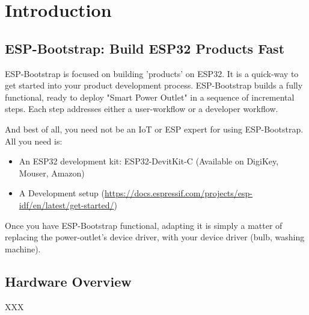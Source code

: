 \documentclass[11pt,fleqn]{book} %
\begin{document}

\pagestyle{fancy} %



\chapter{Introduction}

\section{ESP-Bootstrap: Build ESP32 Products Fast}

ESP-Bootstrap is focused on building 'products' on ESP32. It is a quick-way to get started into your product development process. ESP-Bootstrap builds a fully functional, ready to deploy "Smart Power Outlet" in a sequence of incremental steps. Each step addresses either a user-workflow or a developer workflow.

And best of all, you need not be an IoT or ESP expert for using ESP-Bootstrap. All you need is:

\begin{itemize}
\item An ESP32 development kit: ESP32-DevitKit-C (Available on DigiKey, Mouser, Amazon)
\item A Development setup (\url{https://docs.espressif.com/projects/esp-idf/en/latest/get-started/})
\end{itemize}

Once you have ESP-Bootstrap functional, adapting it is simply a matter of replacing the power-outlet's device driver, with your device driver (bulb, washing machine).

\section{Hardware Overview}
XXX




\end{document}
